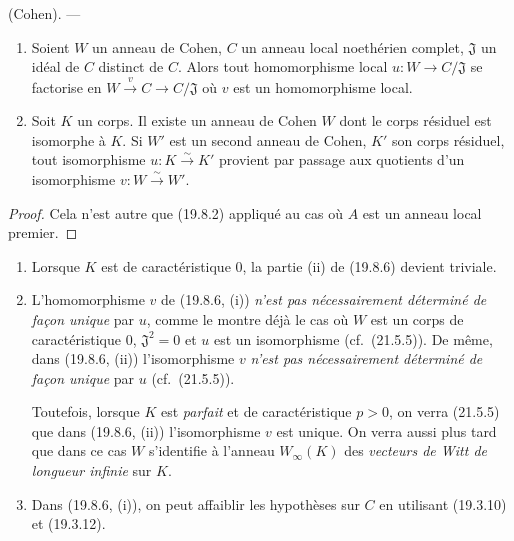 \begin{theorem}[19.8.6]
\label{0.19.8.6-fr}
\textup{(Cohen).} ---
\begin{enumerate}
  \item[\textup{(i)}] Soient $W$ un anneau de Cohen, $C$ un anneau local noethérien
  complet, $\mathfrak J$ un idéal de $C$ distinct de $C$. Alors tout
  homomorphisme local $u:W\to C/\mathfrak J$ se factorise en
  $W\xrightarrow{v}C\to C/\mathfrak J$ où $v$ est un homomorphisme local.
  \item[\textup{(ii)}] Soit $K$ un corps. Il existe un anneau de Cohen $W$ dont le corps
  résiduel est isomorphe à $K$. Si $W'$ est un second anneau de Cohen, $K'$ son
  corps résiduel, tout isomorphisme $u:K\xrightarrow{\sim}K'$ provient par
  passage aux quotients d'un isomorphisme $v:W\xrightarrow{\sim}W'$.
\end{enumerate}
\end{theorem}

\begin{proof}
Cela n'est autre que (19.8.2) appliqué au cas où $A$ est un anneau local
premier.
\end{proof}

\begin{remarks}[19.8.7]
\label{0.19.8.7-fr}
\begin{enumerate}
  \item[(i)] Lorsque $K$ est de caractéristique $0$, la partie (ii) de (19.8.6)
  devient triviale.
  \item[(ii)] L'homomorphisme $v$ de (19.8.6, (i)) \emph{n'est pas
  nécessairement déterminé de façon unique} par $u$, comme le montre déjà le
  cas où $W$ est un corps de caractéristique $0$, $\mathfrak J^2=0$ et $u$ est
  un isomorphisme (cf.~(21.5.5)). De même, dans (19.8.6, (ii)) l'isomorphisme
  $v$ \emph{n'est pas nécessairement déterminé de façon unique} par $u$
  (cf.~(21.5.5)).

  Toutefois, lorsque $K$ est \emph{parfait} et de caractéristique $p>0$, on
  verra (21.5.5) que dans (19.8.6, (ii)) l'isomorphisme $v$ est unique. On verra
  aussi plus tard que dans ce cas $W$ s'identifie à l'anneau $W_\infty(K)$ des
  \emph{vecteurs de Witt de longueur infinie} sur $K$.
  \item[(iii)] Dans (19.8.6, (i)), on peut affaiblir les hypothèses sur $C$ en
  utilisant (19.3.10) et (19.3.12).
\end{enumerate}
\end{remarks}

